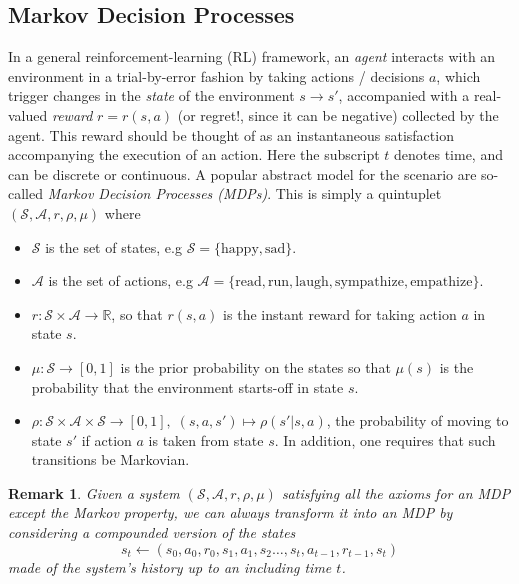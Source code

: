 \documentclass{article} %
\newtheorem{remark}{Remark}
\begin{document}
\subsection{Markov Decision Processes}
In a general reinforcement-learning (RL) framework, an \textit{agent}
interacts with an  environment in a trial-by-error fashion by taking
actions / decisions $a$, which trigger changes in the
\textit{state} of the environment
$s \rightarrow s'$, accompanied with a real-valued \textit{reward}
$r = r(s, a)$ (or regret!, since it can be negative) collected by the
agent. This reward should be thought
of as an instantaneous satisfaction accompanying the execution of
an action. Here the subscript $t$ denotes time, and can be discrete or
continuous.
A popular abstract model for the scenario are so-called \textit{Markov Decision Processes (MDPs)}.
This is simply a quintuplet $(\mathcal S, \mathcal A, r, \rho, \mu)$ where
\begin{itemize}
\item $\mathcal S$ is the set of states, e.g $\mathcal S = \{\text{happy}, \text{sad}\}$.
\item $\mathcal A$ is the set of actions, e.g $\mathcal A = \{\text{read}, \text{run},
  \text{laugh}, \text{sympathize}, \text{empathize}\}.$
\item $r : \mathcal S \times \mathcal A \rightarrow \mathbb R$, so that $r(s, a)$ is the instant reward for taking action $a$ in state $s$.
\item $\mu: \mathcal S \rightarrow [0, 1]$ is the prior probability on the states so that
  $\mu(s)$ is the probability that the environment starts-off in state $s$.
  \item $\rho : \mathcal S \times \mathcal A \times \mathcal S \rightarrow [0, 1],\; (s,a,s') \mapsto \rho(s'|s,a)$, the probability of moving to state $s'$ if action $a$ is taken from state $s$. In addition, one requires that such transitions be Markovian.
\end{itemize}

\begin{remark}
  Given a system $(\mathcal S, \mathcal A, r, \rho, \mu)$ satisfying all the axioms for an MDP
  except the Markov property, we can always transform it into an MDP by considering a compounded
  version of the states
  $$s_t \leftarrow (s_0,a_0,r_0,s_1,a_1,s_2\ldots,s_t,a_{t-1},r_{t-1},s_{t})$$ made of the system's
  history up to an including time $t$.
\end{remark}
\end{document}
